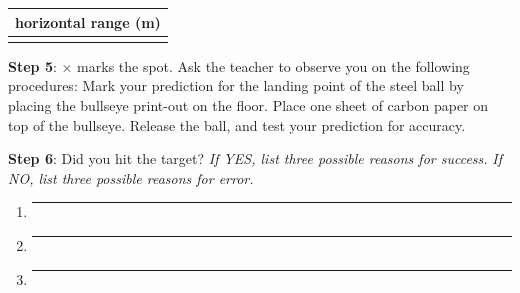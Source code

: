 \documentclass[../main-physics-workbook.tex]{subfiles}
\begin{document}
\medskip

%
\hspace{5mm}
\begin{minipage}{0.25\textwidth}
\begin{center}
    \begin{tabular}{|c|}
        \hline
         \textbf{horizontal range} (m)\\
         \hline \\[1em]
         \hline
    \end{tabular}
\end{center}
\end{minipage}

\bigskip

\noindent \textbf{Step 5}: $\mathbf{\times}$ marks the spot. Ask the teacher to observe you on the following procedures: Mark your prediction for the landing point of the steel ball by placing the bullseye print-out on the floor. Place one sheet of carbon paper on top of the bullseye. Release the ball, and test your prediction for accuracy.

\bigskip

\noindent \textbf{Step 6}: Did you hit the target? \textit{If YES, list three possible reasons for success.} \textit{If NO, list three possible reasons for error.}

\begin{enumerate}[itemsep=4pt]
    \item \par\noindent\rule{0.9\textwidth}{0.4pt}
    \item \par\noindent\rule{0.9\textwidth}{0.4pt}
    \item \par\noindent\rule{0.9\textwidth}{0.4pt}
\end{enumerate}

\clearpage


\vspace*{\fill}
\begin{center}
\end{center}
\vspace*{\fill}
\end{document}
